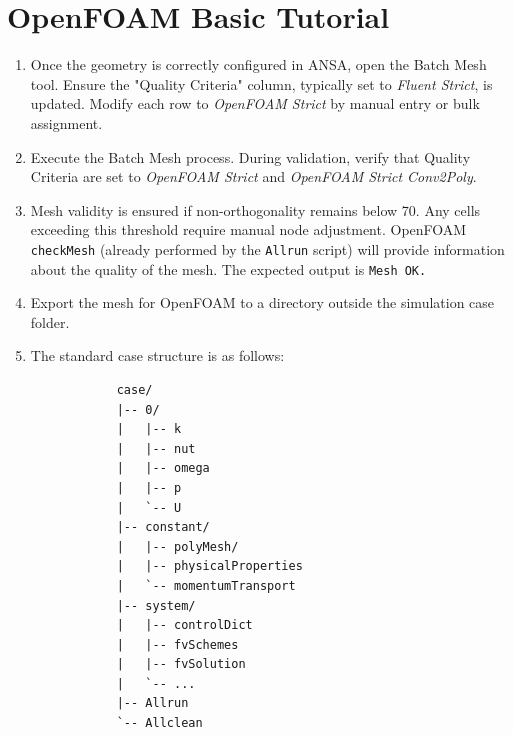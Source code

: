 \documentclass[a4paper]{article}
\begin{document}
	\section{OpenFOAM Basic Tutorial}
	\begin{enumerate}
		\item Once the geometry is correctly configured in ANSA, open the Batch Mesh tool.
		Ensure the "Quality Criteria" column, typically set to \textit{Fluent Strict}, is updated.
		Modify each row to \textit{OpenFOAM Strict} by manual entry or bulk assignment.
		\item Execute the Batch Mesh process. During validation, verify that Quality Criteria are set to \textit{OpenFOAM Strict} and \textit{OpenFOAM Strict Conv2Poly}.
		\item Mesh validity is ensured if non-orthogonality remains below 70. Any cells exceeding this threshold require manual node adjustment. OpenFOAM \texttt{checkMesh} (already performed by the \texttt{Allrun} script) will provide information about the quality of the mesh. The expected output is \texttt{Mesh OK.}
		\item Export the mesh for OpenFOAM to a directory outside the simulation case folder.
		\item The standard case structure is as follows: 
		\begin{verbatim}
			case/
			|-- 0/
			|   |-- k
			|   |-- nut
			|   |-- omega
			|   |-- p
			|   `-- U
			|-- constant/
			|   |-- polyMesh/
			|   |-- physicalProperties
			|   `-- momentumTransport
			|-- system/
			|   |-- controlDict
			|   |-- fvSchemes
			|   |-- fvSolution
			|   `-- ...
			|-- Allrun
			`-- Allclean
			

\end{verbatim}
\end{enumerate}
\end{document}
